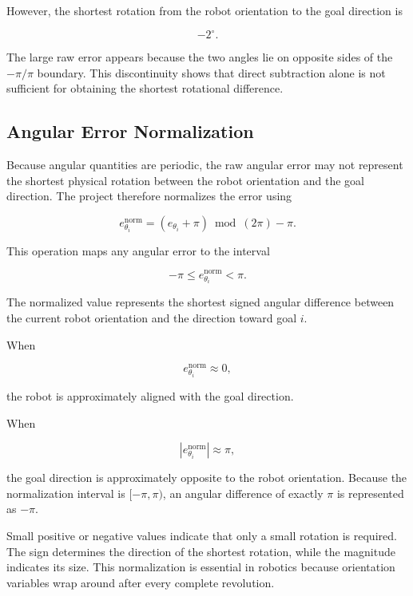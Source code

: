 \documentclass[10pt,twocolumn,a4paper]{article}
\begin{document}
However, the shortest rotation from the robot orientation to the goal 
direction is

\[
    -2^\circ.
\]

The large raw error appears because the two angles lie on opposite sides 
of the $-\pi/\pi$ boundary. This discontinuity shows that direct 
subtraction alone is not sufficient for obtaining the shortest rotational 
difference.

\subsection{Angular Error Normalization}

Because angular quantities are periodic, the raw angular error may not 
represent the shortest physical rotation between the robot orientation 
and the goal direction. The project therefore normalizes the error using

\begin{equation}
    e_{\theta_i}^{\mathrm{norm}}
    =
    \left(e_{\theta_i} + \pi\right)
    \bmod \left(2\pi\right)
    - \pi.
    \label{eq:normalized_angular_error}
\end{equation}

This operation maps any angular error to the interval

\[
    -\pi \leq e_{\theta_i}^{\mathrm{norm}} < \pi.
\]

The normalized value represents the shortest signed angular difference 
between the current robot orientation and the direction toward goal $i$.

When

\[
    e_{\theta_i}^{\mathrm{norm}} \approx 0,
\]

the robot is approximately aligned with the goal direction.

When

\[
    \left|e_{\theta_i}^{\mathrm{norm}}\right| \approx \pi,
\]

the goal direction is approximately opposite to the robot orientation. 
Because the normalization interval is $[-\pi,\pi)$, an angular difference 
of exactly $\pi$ is represented as $-\pi$.

Small positive or negative values indicate that only a small rotation is 
required. The sign determines the direction of the shortest rotation, 
while the magnitude indicates its size. This normalization is essential 
in robotics because orientation variables wrap around after every 
complete revolution.
\end{document}
